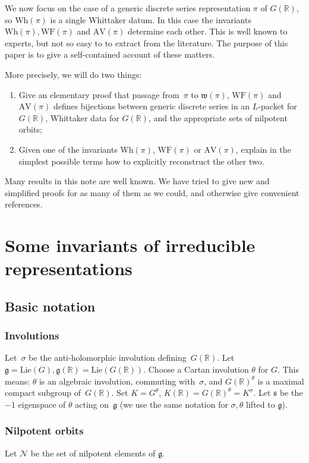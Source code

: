 \documentclass[10pt,leqno]{article}
\newcommand{\R}{\mathbb R}
\newcommand{\N}{\mathcal N}
\newcommand{\Lie}{\mathrm{Lie}}
\newcommand{\g}{\mathfrak g}
\newcommand{\s}{\mathfrak s}
\newcommand{\AV}{\mathrm{AV}}
\newcommand{\Wh}{\mathrm{Wh}}
\newcommand{\WF}{\mathrm{WF}}
\begin{document}
We now focus on the case of a generic discrete series representation
$\pi$ of $G(\R)$, so $\Wh(\pi)$ is a single Whittaker datum.  In this
case the invariants $\Wh(\pi), \WF(\pi)$ and $\AV(\pi)$ determine each
other. This is well known to experts, but not so easy to to extract
from the literature. The purpose
of this paper is to give a self-contained account of these matters.

More precisely, we will do two things:
\begin{enumerate}
\item Give an elementary proof that  passage from~$\pi$ to $\mathfrak{w}(\pi)$, $\WF(\pi)$ and $\AV(\pi)$ defines bijections between generic discrete series in an $L$-packet for $G(\R)$, Whittaker data for $G(\R)$, and the appropriate sets of nilpotent orbits;
\item Given one of the invariants $\Wh(\pi)$, $\WF(\pi)$ or $\AV(\pi)$, explain in the simplest possible terms how to explicitly reconstruct the other two.
\end{enumerate}
Many results in this note are well known. We have tried to give new and simplified proofs for as many of them as we could, and otherwise give convenient references.

\section{Some invariants of irreducible representations}

\subsection{Basic notation}

\subsubsection*{Involutions} 


Let~$\sigma$ be the anti-holomorphic involution defining~$G(\R)$.
Let $\g=\Lie(G), \g(\R)=\Lie(G(\R))$. 
Choose a Cartan involution $\theta$ for $G$. This means:
$\theta$ is an algebraic involution, commuting with~$\sigma$,
and $G(\R)^\theta$ is a maximal compact subgroup of~$G(\R)$. Set $K=G^\theta$, $K(\R)=G(\R)^\theta=K^\sigma$.
Let $\s$ be the $-1$ eigenspace of $\theta$ acting on~$\g$
(we use the same notation for $\sigma,\theta$ lifted to $\g$). 

\subsubsection*{Nilpotent orbits} 
\label{s:nilpotentorbits}
Let $\N$ be the set of nilpotent elements of $\g$. 
\end{document}
